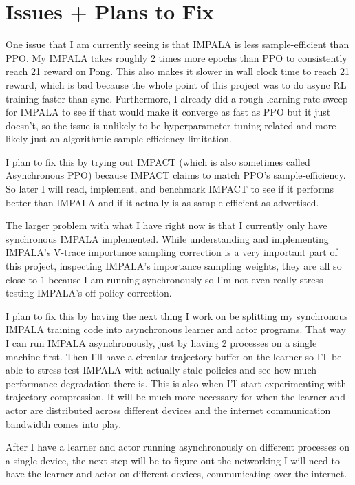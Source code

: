 \documentclass{article}
\begin{document}
\section{Issues + Plans to Fix}
One issue that I am currently seeing is that IMPALA is less sample-efficient than PPO. My IMPALA takes roughly
2 times more epochs than PPO to consistently reach 21 reward on Pong. This also makes it slower in wall
clock time to reach 21 reward, which is bad because the whole point of this project was to do async RL training
faster than sync. Furthermore, I already did a rough learning rate sweep for IMPALA to see if that would make
it converge as fast as PPO but it just doesn't, so the issue is unlikely to be hyperparameter tuning related
and more likely just an algorithmic sample efficiency limitation.

I plan to fix this by trying out IMPACT (which is also sometimes called Asynchronous PPO) because IMPACT
claims to match PPO's sample-efficiency. So later I will read, implement, and benchmark IMPACT to see if it
performs better than IMPALA and if it actually is as sample-efficient as advertised.

The larger problem with what I have right now is that I currently only have synchronous IMPALA implemented.
While understanding and implementing IMPALA's V-trace importance sampling correction is a very important
part of this project, inspecting IMPALA's importance sampling weights, they are all so close to $1$ because
I am running synchronously so I'm not even really stress-testing IMPALA's off-policy correction.

I plan to fix this by having the next thing I work on be splitting my synchronous IMPALA training code
into asynchronous learner and actor programs. That way I can run IMPALA asynchronously, just by having 2
processes on a single machine first. Then I'll have a circular trajectory buffer on the learner so I'll be
able to stress-test IMPALA with actually stale policies and see how much performance degradation there is.
This is also when I'll start experimenting with trajectory compression. It will be much more necessary
for when the learner and actor are distributed across different devices and the internet communication
bandwidth comes into play.

After I have a learner and actor running asynchronously on different processes on a single device, the next
step will be to figure out the networking I will need to have the learner and actor on different devices,
communicating over the internet.
\end{document}
